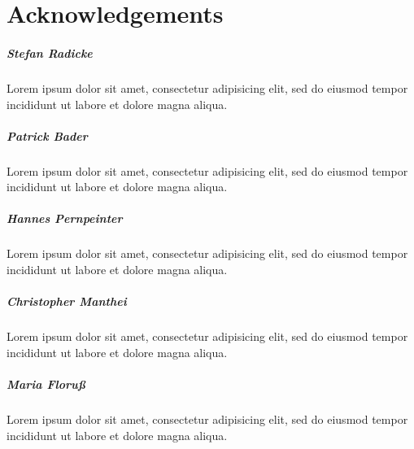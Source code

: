 
\chapter*{Acknowledgements}
\label{cha:Acknowledgements}

\paragraph{Stefan Radicke}
  Lorem ipsum dolor sit amet, consectetur adipisicing elit, sed do eiusmod
  tempor incididunt ut labore et dolore magna aliqua.

\paragraph{Patrick Bader}
  Lorem ipsum dolor sit amet, consectetur adipisicing elit, sed do eiusmod
  tempor incididunt ut labore et dolore magna aliqua.

\paragraph{Hannes Pernpeinter}
  Lorem ipsum dolor sit amet, consectetur adipisicing elit, sed do eiusmod
  tempor incididunt ut labore et dolore magna aliqua.

\paragraph{Christopher Manthei}
  Lorem ipsum dolor sit amet, consectetur adipisicing elit, sed do eiusmod
  tempor incididunt ut labore et dolore magna aliqua.

\paragraph{Maria Floruß}
  Lorem ipsum dolor sit amet, consectetur adipisicing elit, sed do eiusmod
  tempor incididunt ut labore et dolore magna aliqua.
